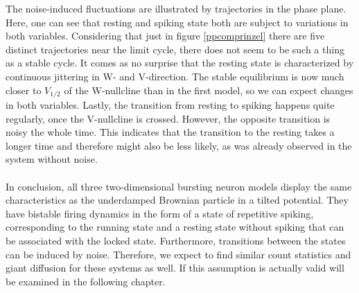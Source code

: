 \documentclass[12pt,a4paper]{article}
\begin{document}
The noise-induced fluctuations are illustrated by trajectories in the phase plane. Here, one can see that resting and spiking state both are subject to variations in both variables. Considering that just in figure \ref{ppcomprinzel} there are five distinct trajectories near the limit cycle, there does not seem to be such a thing as a stable cycle. It comes as no surprise that the resting state is characterized by continuous jittering in W- and V-direction. The stable equilibrium is now much closer to $V_{1/2}$ of the W-nullcline than in the first model, so we can expect changes in both variables. Lastly, the transition from resting to spiking happens quite regularly, once the V-nullcline is crossed. However, the opposite transition is noisy the whole time. This indicates that the transition to the resting takes a longer time and therefore might also be less likely, as was already observed in the system without noise.\\\\
In conclusion, all three two-dimensional bursting neuron models display the same characteristics as the underdamped Brownian particle in a tilted potential. They have bistable firing dynamics in the form of a state of repetitive spiking, corresponding to the running state and a resting state without spiking that can be associated with the locked state. Furthermore, transitions between the states can be induced by noise. Therefore, we expect to find similar count statistics and giant diffusion for these systems as well. If this assumption is actually valid will be examined in the following chapter.
\end{document}
